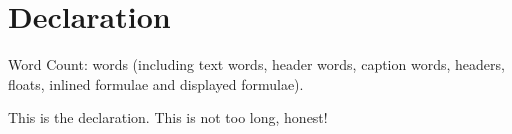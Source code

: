 \chapter*{Declaration}


Word Count: \wordcount{} words (including text words, header words, caption words, headers, floats, inlined formulae and displayed formulae).


This is the declaration. This is not too long, honest!

\cleardoublepage{}

\endinput
